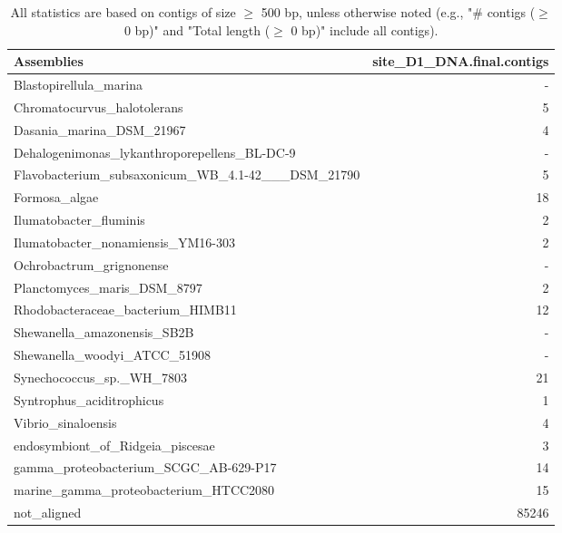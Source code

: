 \documentclass[12pt,a4paper]{article}
\begin{document}
\begin{table}[ht]
\begin{center}
\caption{All statistics are based on contigs of size $\geq$ 500 bp, unless otherwise noted (e.g., "\# contigs ($\geq$ 0 bp)" and "Total length ($\geq$ 0 bp)" include all contigs).}
\begin{tabular}{|l*{1}{|r}|}
\hline
Assemblies & site\_D1\_DNA.final.contigs \\ \hline
Blastopirellula\_marina & - \\ \hline
Chromatocurvus\_halotolerans & 5 \\ \hline
Dasania\_marina\_DSM\_21967 & 4 \\ \hline
Dehalogenimonas\_lykanthroporepellens\_BL-DC-9 & - \\ \hline
Flavobacterium\_subsaxonicum\_WB\_4.1-42\_\_\_DSM\_21790 & 5 \\ \hline
Formosa\_algae & 18 \\ \hline
Ilumatobacter\_fluminis & 2 \\ \hline
Ilumatobacter\_nonamiensis\_YM16-303 & 2 \\ \hline
Ochrobactrum\_grignonense & - \\ \hline
Planctomyces\_maris\_DSM\_8797 & 2 \\ \hline
Rhodobacteraceae\_bacterium\_HIMB11 & 12 \\ \hline
Shewanella\_amazonensis\_SB2B & - \\ \hline
Shewanella\_woodyi\_ATCC\_51908 & - \\ \hline
Synechococcus\_sp.\_WH\_7803 & 21 \\ \hline
Syntrophus\_aciditrophicus & 1 \\ \hline
Vibrio\_sinaloensis & 4 \\ \hline
endosymbiont\_of\_Ridgeia\_piscesae & 3 \\ \hline
gamma\_proteobacterium\_SCGC\_AB-629-P17 & 14 \\ \hline
marine\_gamma\_proteobacterium\_HTCC2080 & 15 \\ \hline
not\_aligned & 85246 \\ \hline
\end{tabular}
\end{center}
\end{table}
\end{document}

